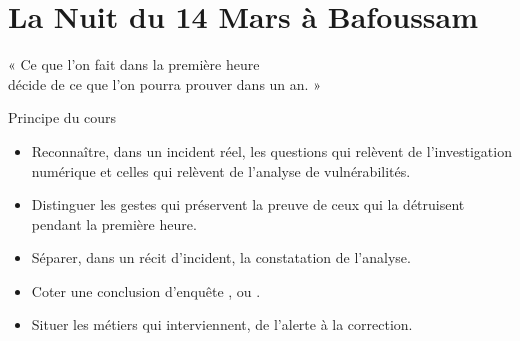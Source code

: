 
\chapter{La Nuit du 14 Mars à Bafoussam}
\label{chap:prologue}

\epigraph{%
    « Ce que l'on fait dans la première heure\\
    décide de ce que l'on pourra prouver dans un an. »%
}{Principe du cours}


\begin{boxobjectifs}
\begin{itemize}
    \item Reconnaître, dans un incident réel, les questions qui relèvent de
          l'investigation numérique et celles qui relèvent de l'analyse de
          vulnérabilités.
    \item Distinguer les gestes qui préservent la preuve de ceux qui la
          détruisent pendant la première heure.
    \item Séparer, dans un récit d'incident, la constatation de l'analyse.
    \item Coter une conclusion d'enquête \OUI{}, \NON{} ou \NEK{}.
    \item Situer les métiers qui interviennent, de l'alerte à la correction.
\end{itemize}
\end{boxobjectifs}

\bigskip

